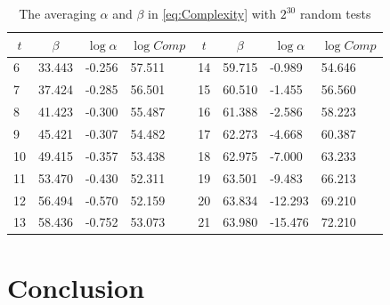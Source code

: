 \begin{table}[htbp]
  \centering
  \caption{The averaging $\alpha$ and $\beta$ in \eqref{eq:Complexity} with $2^{30}$ random tests}\label{tab:ZhangAlphaAndBetaOriginal}
    \begin{tabular}{|l|l|l|l|l|l|l|l|}
    \hline
    \multicolumn{1}{|c|}{$t$} & \multicolumn{1}{c|}{$\beta$} & \multicolumn{1}{c|}{$\log\alpha$} & \multicolumn{1}{c|}{$\log Comp$} & \multicolumn{1}{c|}{$t$} & \multicolumn{1}{c|}{$\beta$} & \multicolumn{1}{c|}{$\log\alpha$} & \multicolumn{1}{c|}{$\log Comp$} \\
    \hline

    6    & 33.443 & -0.256 & 57.511 & 14    & 59.715 & -0.989 &  54.646\\
    \hline
    7    & 37.424 & -0.285 & 56.501 & 15    & 60.510 & -1.455 &  56.560\\
    \hline
    8    & 41.423 & -0.300 & 55.487 & 16    & 61.388 & -2.586 &  58.223\\
    \hline
    9    & 45.421  & -0.307 & 54.482 & 17    & 62.273 & -4.668 &  60.387\\
    \hline
    10   & 49.415 & -0.357  & 53.438 & 18    & 62.975 & -7.000 &  63.233\\
    \hline
    11    & 53.470 & -0.430 & 52.311 & 19    & 63.501 & -9.483 &  66.213\\
    \hline
    12    & 56.494 & -0.570 & 52.159 & 20    & 63.834 & -12.293 &  69.210\\
    \hline
    13    & 58.436 & -0.752 & 53.073 & 21    & 63.980 & -15.476 &  72.210\\
    \hline
    \end{tabular}%
\end{table}%



\section{Conclusion}





\ifLNCSVER
  
\else
  
\fi





\ifLNCSVER

\else

\fi





